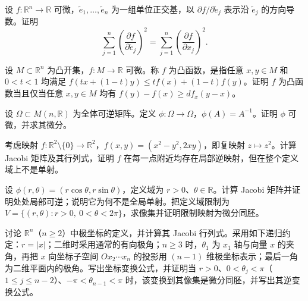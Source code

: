 \noindent\begin{minipage}{\textwidth}
设 $f:\mathbb R^n\to\mathbb R$ 可微，$\widetilde e_1,\ldots,\widetilde e_n$ 为一组单位正交基，以 $\partial f/\partial\widetilde e_j$ 表示沿 $\widetilde e_j$ 的方向导数。证明\[\sum_{j=1}^n\left(\frac{\partial f}{\partial\widetilde e_j}\right)^2=\sum_{j=1}^n\left(\frac{\partial f}{\partial x_j}\right)^2.\]
\end{minipage}\par\vfill
\newpage
\noindent\begin{minipage}{\textwidth}
设 $M\subset\mathbb R^n$ 为凸开集，$f:M\to\mathbb R$ 可微。称 $f$ 为凸函数，是指任意 $x,y\in M$ 和 $0<t<1$ 均满足 $f(tx+(1-t)y)\le tf(x)+(1-t)f(y)$。证明 $f$ 为凸函数当且仅当任意 $x,y\in M$ 均有 $f(y)-f(x)\ge df_x(y-x)$。
\end{minipage}\par\vfill
\noindent\begin{minipage}{\textwidth}
设 $\Omega\subset M(n,\mathbb R)$ 为全体可逆矩阵。定义 $\phi:\Omega\to\Omega$，$\phi(A)=A^{-1}$。证明 $\phi$ 可微，并求其微分。
\end{minipage}\par\vfill
\noindent\begin{minipage}{\textwidth}
考虑映射 $f:\mathbb R^2\setminus\{0\}\to\mathbb R^2$，$f(x,y)=(x^2-y^2,2xy)$，即复映射 $z\mapsto z^2$。计算 Jacobi 矩阵及其行列式，证明 $f$ 在每一点附近均存在局部逆映射，但在整个定义域上不是单射。
\end{minipage}\par\vfill
\noindent\begin{minipage}{\textwidth}
设 $\phi(r,\theta)=(r\cos\theta,r\sin\theta)$，定义域为 $r>0$、$\theta\in\mathbb R$。计算 Jacobi 矩阵并证明处处局部可逆；说明它为何不是全局单射。把定义域限制为 $V=\{(r,\theta):r>0,\ 0<\theta<2\pi\}$，求像集并证明限制映射为微分同胚。
\end{minipage}\par\vfill
\newpage
\noindent\begin{minipage}{\textwidth}
讨论 $\mathbb R^n$（$n\ge2$）中极坐标的定义，并计算其 Jacobi 行列式。采用如下递归约定：$r=|x|$；二维时采用通常的有向极角；$n\ge3$ 时，$\theta_1$ 为 $x_1$ 轴与向量 $x$ 的夹角，再把 $x$ 向坐标子空间 $Ox_2\cdots x_n$ 的投影用 $(n-1)$ 维极坐标表示；最后一角为二维平面内的极角。写出坐标变换公式，并证明当 $r>0$、$0<\theta_j<\pi$（$1\le j\le n-2$）、$-\pi<\theta_{n-1}<\pi$ 时，该变换到其像集是微分同胚，并写出其逆变换公式。
\end{minipage}\par\vfill
